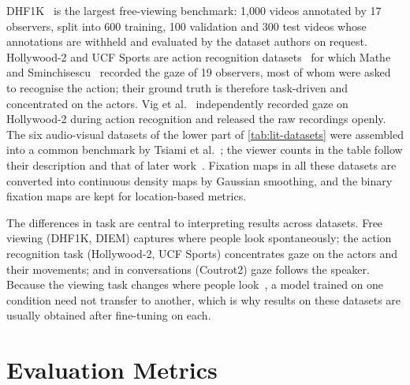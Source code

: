 DHF1K~\cite{wang2018revisiting,wang2021revisiting} is the largest free-viewing
benchmark: 1,000 videos annotated by 17 observers, split into 600 training, 100
validation and 300 test videos whose annotations are withheld and evaluated by
the dataset authors on request. Hollywood-2 and UCF Sports are action
recognition datasets~\cite{marszalek2009actions,rodriguez2008action} for which
Mathe and Sminchisescu~\cite{mathe2015actions} recorded the gaze of 19 observers,
most of whom were asked to recognise the action; their ground truth is therefore
task-driven and concentrated on the actors. Vig et al.~\cite{vig2012space}
independently recorded gaze on Hollywood-2 during action recognition and
released the raw recordings openly. The six audio-visual datasets of the
lower part of \cref{tab:lit-datasets} were assembled into a common benchmark by
Tsiami et al.~\cite{tsiami2020stavis}; the viewer counts in the table follow
their description and that of later work~\cite{xiong2024diffsal}. Fixation maps
in all these datasets are converted into continuous density maps by Gaussian
smoothing, and the binary fixation maps are kept for location-based metrics.

The differences in task are central to interpreting results across datasets.
Free viewing (DHF1K, DIEM) captures where people look spontaneously; the action
recognition task (Hollywood-2, UCF Sports) concentrates gaze on the actors and
their movements; and in conversations (Coutrot2) gaze follows the speaker.
Because the viewing task changes where people
look~\cite{castelhano2009viewing,smith2013attentional}, a model trained on one
condition need not transfer to another, which is why results on these datasets
are usually obtained after fine-tuning on each.

\section{Evaluation Metrics}\label{sec:metrics}

